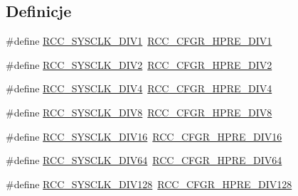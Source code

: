 \subsection*{Definicje}
\begin{DoxyCompactItemize}
\item 
\#define \hyperlink{group___r_c_c___a_h_b___clock___source_ga226f5bf675015ea677868132b6b83494}{R\+C\+C\+\_\+\+S\+Y\+S\+C\+L\+K\+\_\+\+D\+I\+V1}~\hyperlink{group___peripheral___registers___bits___definition_ga2b7d7f29b09a49c31404fc0d44645c84}{R\+C\+C\+\_\+\+C\+F\+G\+R\+\_\+\+H\+P\+R\+E\+\_\+\+D\+I\+V1}
\item 
\#define \hyperlink{group___r_c_c___a_h_b___clock___source_gac37c0610458a92e3cb32ec81014625c3}{R\+C\+C\+\_\+\+S\+Y\+S\+C\+L\+K\+\_\+\+D\+I\+V2}~\hyperlink{group___peripheral___registers___bits___definition_gaa9eeb5e38e53e79b08a4ac438497ebea}{R\+C\+C\+\_\+\+C\+F\+G\+R\+\_\+\+H\+P\+R\+E\+\_\+\+D\+I\+V2}
\item 
\#define \hyperlink{group___r_c_c___a_h_b___clock___source_ga6fd3652d6853563cdf388a4386b9d22f}{R\+C\+C\+\_\+\+S\+Y\+S\+C\+L\+K\+\_\+\+D\+I\+V4}~\hyperlink{group___peripheral___registers___bits___definition_gaffe860867ae4b1b6d28473ded1546d91}{R\+C\+C\+\_\+\+C\+F\+G\+R\+\_\+\+H\+P\+R\+E\+\_\+\+D\+I\+V4}
\item 
\#define \hyperlink{group___r_c_c___a_h_b___clock___source_ga7def31373854ba9c72bb76b1d13e3aad}{R\+C\+C\+\_\+\+S\+Y\+S\+C\+L\+K\+\_\+\+D\+I\+V8}~\hyperlink{group___peripheral___registers___bits___definition_gaca71d6b42bdb83b5ff5320578869a058}{R\+C\+C\+\_\+\+C\+F\+G\+R\+\_\+\+H\+P\+R\+E\+\_\+\+D\+I\+V8}
\item 
\#define \hyperlink{group___r_c_c___a_h_b___clock___source_ga895462b261e03eade3d0139cc1327a51}{R\+C\+C\+\_\+\+S\+Y\+S\+C\+L\+K\+\_\+\+D\+I\+V16}~\hyperlink{group___peripheral___registers___bits___definition_ga3806da4f1afc9e5be0fca001c8c57815}{R\+C\+C\+\_\+\+C\+F\+G\+R\+\_\+\+H\+P\+R\+E\+\_\+\+D\+I\+V16}
\item 
\#define \hyperlink{group___r_c_c___a_h_b___clock___source_ga73814b5a7ee000687ec8334637ca5b14}{R\+C\+C\+\_\+\+S\+Y\+S\+C\+L\+K\+\_\+\+D\+I\+V64}~\hyperlink{group___peripheral___registers___bits___definition_ga1caeba8dc2b4c0bb11be600e983e3370}{R\+C\+C\+\_\+\+C\+F\+G\+R\+\_\+\+H\+P\+R\+E\+\_\+\+D\+I\+V64}
\item 
\#define \hyperlink{group___r_c_c___a_h_b___clock___source_ga43eddf4d4160df30548a714dce102ad8}{R\+C\+C\+\_\+\+S\+Y\+S\+C\+L\+K\+\_\+\+D\+I\+V128}~\hyperlink{group___peripheral___registers___bits___definition_ga280da821f0da1bec1f4c0e132ddf8eab}{R\+C\+C\+\_\+\+C\+F\+G\+R\+\_\+\+H\+P\+R\+E\+\_\+\+D\+I\+V128}

\end{DoxyCompactItemize}
